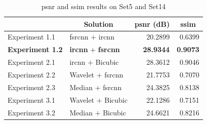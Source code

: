 \begin{table}[]
	\centering
	\begin{tabular}{|l|l|r|r|}
		\hline
		\rowcolor[HTML]{EFEFEF} 
		\multicolumn{1}{|c|}{\cellcolor[HTML]{EFEFEF}\textbf{Experiment}} &
		\multicolumn{1}{c|}{\cellcolor[HTML]{EFEFEF}\textbf{Solution}} & \multicolumn{1}{c|}{\cellcolor[HTML]{EFEFEF}\textbf{\gls{psnr} (dB)}} & \multicolumn{1}{c|}{\cellcolor[HTML]{EFEFEF}\textbf{\gls{ssim}}} \\ \hline
		\rowcolor[HTML]{FFFFFF} 
		\cellcolor[HTML]{EFEFEF} Experiment 1.1 & \gls{fsrcnn} $+$ \gls{ircnn} & 20.2899 & 0.6399 \\
		\rowcolor[HTML]{EFEFEF} 
		\cellcolor[HTML]{EFEFEF} \textbf{Experiment 1.2} & \textbf{\gls{ircnn}} $+$ \textbf{\gls{fsrcnn}} & \textbf{28.9344} & \textbf{0.9073} \\
		\rowcolor[HTML]{FFFFFF} 
		\cellcolor[HTML]{EFEFEF} Experiment 2.1 & \gls{ircnn} $+$ Bicubic & 28.3612 & 0.9046\\
		\rowcolor[HTML]{EFEFEF} 
		\cellcolor[HTML]{EFEFEF} Experiment 2.2 & Wavelet $+$ \gls{fsrcnn} & 21.7753 & 0.7070 \\ 
		\rowcolor[HTML]{FFFFFF} 
		\cellcolor[HTML]{EFEFEF} Experiment 2.3 & Median $+$ \gls{fsrcnn} & 24.3825 & 0.8138 \\
		\rowcolor[HTML]{EFEFEF} 
		\cellcolor[HTML]{EFEFEF} Experiment 3.1 & Wavelet $+$ Bicubic & 22.1286 & 0.7151 \\ 
		\rowcolor[HTML]{FFFFFF} 
		\cellcolor[HTML]{EFEFEF} Experiment 3.2 & Median $+$ Bicubic & 24.6621 & 0.8216 \\
		\hline
	\end{tabular}
	\caption{\gls{psnr} and \gls{ssim} results on Set5 and Set14}
	\label{tab:expsum}
\end{table}

